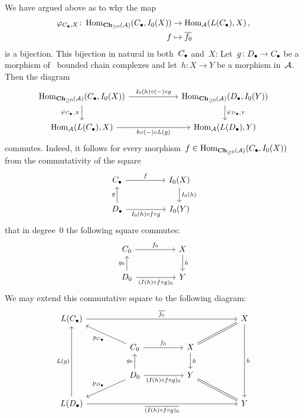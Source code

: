 We have argued above as to why the map
\begin{align*}
  \varphi_{C_\bullet,X}
  \colon
  \operatorname{Hom}_{\mathbf{Ch}_{\geq 0}(\mathcal{A})}(C_\bullet, I_0(X))
  &\to
  \operatorname{Hom}_{\mathcal{A}}(L(C_\bullet), X)  \,,
  \\
  f
  &\mapsto
  \overline{f_0}
\end{align*}
is a bijection.
This bijection in natural in both~$C_\bullet$ and~$X$:
Let~$g \colon D_\bullet \to C_\bullet$ be a morphism of~ bounded chain complexes and let~$h \colon X \to Y$ be a morphism in~$\mathcal{A}$.
Then the diagram
\begin{equation}
  \label{equation: naturality square}
  \begin{tikzcd}[column sep = 6em]
      \Hom_{\Chh_{\geq 0}(\Acat)}(\Ccc, I_0(X))
      \arrow{r}[above]{I_0(h) \circ (-) \circ g}
      \arrow{d}[left]{\varphi_{\Ccc,X}}
    & \Hom_{\Chh_{\geq 0}(\Acat)}(\Dcc, I_0(Y))
      \arrow{d}[right]{\varphi_{\Dcc,Y}}
    \\
      \Hom_{\Acat}(L(\Ccc), X)
      \arrow{r}[below]{h \circ (-) \circ L(g)}
    & \Hom_{\Acat}(L(\Dcc), Y)
  \end{tikzcd}
\end{equation}
commutes.
Indeed, it follows for every morphism~$f \in \operatorname{Hom}_{\mathbf{Ch}_{\geq 0}(\mathcal{A})}(C_\bullet, I_0(X))$ from the commutativity of the square
\[
  \begin{tikzcd}[column sep = huge]
      \Ccc
      \arrow{r}[above]{f}
    & I_0(X)
      \arrow{d}[right]{I_0(h)}
    \\
      \Dcc
      \arrow{u}[left]{g}
      \arrow{r}[below]{I_0(h) \circ f \circ g}
    & I_0(Y)
  \end{tikzcd}
\]
that in degree~$0$ the following square commutes:
\[
  \begin{tikzcd}[column sep = huge]
      C_0
      \arrow{r}[above]{f_0}
    & X
      \arrow{d}[right]{h}
    \\
      D_0
      \arrow{u}[left]{g_0}
      \arrow{r}[below]{(I(h) \circ f \circ g)_0}
    & Y
  \end{tikzcd}
\]
We may extend this commutative square to the following diagram:
\[
  \begin{tikzcd}[column sep = huge]
      L(\Ccc)
      \arrow{rrr}[above]{\induced{f_0}}
    & {}
    & {}
    & X
      \arrow{ddd}[right]{h}
    \\
      {}
    & C_0
      \arrow{ul}[below left]{p_{\Ccc}}
      \arrow{r}[above]{f_0}
    & X
      \arrow[equal]{ur}
      \arrow{d}[right]{h}
    & {}
    \\
      {}
    & D_0
      \arrow{dl}[above left]{p_{\Dcc}}
      \arrow{u}[left]{g_0}
      \arrow{r}[below]{(I(h) \circ f \circ g)_0}
    & Y
      \arrow[equal]{dr}
    & {}
    \\
      L(\Dcc)
      \arrow{uuu}[left]{L(g)}
      \arrow{rrr}[below]{\induced{(I(h) \circ f \circ g)_0}}
    & {}
    & {}
    & Y
  \end{tikzcd}
\]
